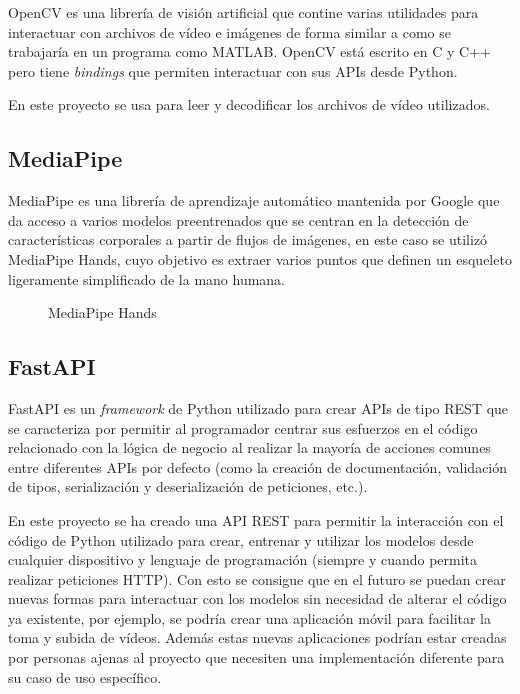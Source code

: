 OpenCV es una librería de visión artificial que contine varias utilidades para
interactuar con archivos de vídeo e imágenes de forma similar a como se
trabajaría en un programa como MATLAB. OpenCV está escrito en C y C++ pero tiene
\textit{bindings} que permiten interactuar con sus APIs desde Python.

En este proyecto se usa para leer y decodificar los archivos de vídeo
utilizados.


\subsection{MediaPipe}

MediaPipe es una librería de aprendizaje automático mantenida por Google que da
acceso a varios modelos preentrenados que se centran en la detección de
características corporales a partir de flujos de imágenes, en este caso se
utilizó MediaPipe Hands, cuyo objetivo es extraer varios puntos que definen un
esqueleto ligeramente simplificado de la mano humana.

\begin{figure}[h]
    \centering
    \caption{MediaPipe Hands}
\end{figure}


\subsection{FastAPI}

FastAPI es un \textit{framework} de Python utilizado para crear APIs de tipo
REST que se caracteriza por permitir al programador centrar sus esfuerzos en el
código relacionado con la lógica de negocio al realizar la mayoría de acciones
comunes entre diferentes APIs por defecto (como la creación de documentación,
validación de tipos, serialización y deserialización de peticiones, etc.).

En este proyecto se ha creado una API REST para permitir la interacción con el
código de Python utilizado para crear, entrenar y utilizar los modelos desde
cualquier dispositivo y lenguaje de programación (siempre y cuando permita
realizar peticiones HTTP). Con esto se consigue que en el futuro se puedan crear
nuevas formas para interactuar con los modelos sin necesidad de alterar el
código ya existente, por ejemplo, se podría crear una aplicación móvil para
facilitar la toma y subida de vídeos. Además estas nuevas aplicaciones podrían
estar creadas por personas ajenas al proyecto que necesiten una implementación
diferente para su caso de uso específico.


